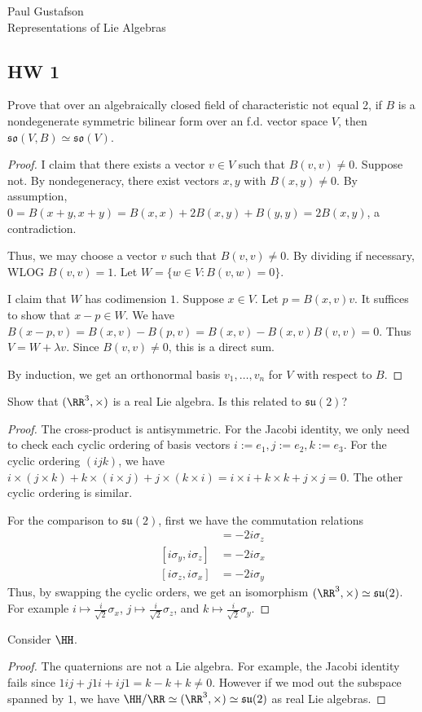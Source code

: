 \documentclass{article}
\begin{document}
\noindent Paul Gustafson\\
\noindent Representations of Lie Algebras

\subsection*{HW 1}
 Prove that over an algebraically closed field of characteristic not equal 2, if $B$ is a nondegenerate symmetric bilinear form over an f.d. vector space $V$, then $\mathfrak{so}(V,B) \simeq \mathfrak{so}(V)$.
\begin{proof}
I claim that there exists a vector $v \in V$ such that $B(v,v) \neq 0$.  Suppose not.  By nondegeneracy, there exist vectors $x,y$ with $B(x,y) \neq 0$.  By assumption, $0 = B(x+y, x+y) = B(x,x) + 2B(x,y) + B(y,y) = 2B(x,y)$, a contradiction.

Thus, we may choose a vector $v$ such that $B(v,v) \neq 0$. By dividing if necessary, WLOG $B(v,v) = 1$.  Let $W = \{w \in V : B(v,w) = 0\}$.  

I claim that $W$ has codimension $1$.  Suppose $x \in V$.  Let $p = B(x,v) v$.   It suffices to show that $x - p \in W$.  We have $B(x-p, v) = B(x,v) - B(p,v) = B(x,v) - B(x,v) B(v,v) = 0$.  Thus $V = W + \lambda v$.  Since $B(v,v) \neq 0$, this is a direct sum.

By induction, we get an orthonormal basis $v_1, \ldots, v_n$ for $V$ with respect to $B$.
\end{proof}

  Show that $(\RR^3, \times)$ is a real Lie algebra.  Is this related to $\mathfrak{su}(2)$?
\begin{proof}
The cross-product is antisymmetric.  For the Jacobi identity, we only need to check each cyclic ordering of basis vectors $i:= e_1, j:= e_2, k:= e_3$.  For the cyclic ordering $(ijk)$, we have
$i \times (j \times k) + k \times (i \times j) + j \times (k \times i) = i \times i + k \times k + j \times j = 0$.  The other cyclic ordering is similar.

For the comparison to $\mathfrak{su}(2)$, first we have the commutation relations
\begin{align*}
[i\sigma_x, i\sigma_y] & = -2 i\sigma_z \\
[i\sigma_y, i\sigma_z] & = -2 i\sigma_x \\
[i\sigma_z, i\sigma_x] & = -2 i\sigma_y 
\end{align*}
Thus, by swapping the cyclic orders, we get an isomorphism  $(\RR^3, \times) \simeq \mathfrak{su}(2)$.  For example $i \mapsto \frac{i}{\sqrt 2} \sigma_x$, $j \mapsto \frac{i}{\sqrt 2} \sigma_z$, and $k \mapsto \frac{i}{\sqrt 2} \sigma_y$.
\end{proof}

 Consider $\HH$.
\begin{proof}
The quaternions are not a Lie algebra.  For example, the Jacobi identity fails since
$1ij + j1i + ij1 = k -k + k \neq 0$.  However if we mod out the subspace spanned by $1$,
 we have $\HH/\RR \simeq (\RR^3, \times) \simeq  \mathfrak{su}(2)$ as real Lie algebras.
\end{proof}
\end{document}
